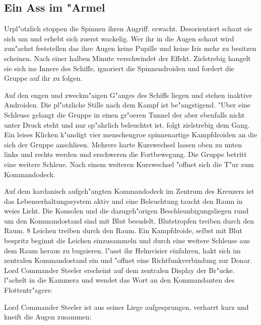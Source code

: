 \subsection{Ein Ass im "Armel}
Urpl"otzlich stoppen die Spinnen ihren Angriff. \xl{} erwacht. Desorientiert schaut sie sich um und erhebt sich zuerst wackelig. Wer ihr in die Augen schaut wird zun"achst feststellen das ihre Augen keine Pupille und keine Iris mehr zu besitzen scheinen. Nach einer halben Minute verschwindet der Effekt. Zielstrebig hangelt sie sich ins Innere des Schiffe, ignoriert die Spinnendroiden und fordert die Gruppe auf ihr zu folgen.


Auf den engen und zweckm"a\3igen G"anges des Schiffs liegen und stehen inaktive Androiden. Die pl"otzliche Stille nach dem Kampf ist be"angstigend. "Uber eine Schleuse gelangt die Gruppe in einen gr"o\3eren Tunnel der aber ebenfalls nicht unter Druck steht und nur sp"ahrlich beleuchtet ist. \xl{} folgt zielstrebig dem Gang. Ein leises Klicken k"undigt vier menschengro\3e spinnenartige Kampfdroiden an die sich der Gruppe anschlie\3en. Mehrere harte Kurswechsel lassen oben zu unten links und rechts werden und erschweren die Fortbewegung. 
Die Gruppe betritt eine weitere Schleu\3e. Nach einem weiteren Kurswechsel "offnet sich die T"ur zum Kommandodeck.

Auf dem kardanisch aufgeh"angten Kommandodeck im Zentrum des Kreuzers ist das Lebenserhaltungssystem aktiv und eine Beleuchtung taucht den Raum in wei\3es Licht. Die Konsolen und die dazugeh"origen Beschleunbigungsliegen rund um den Kommandostand sind mit Blut besudelt. Blutstropfen treiben durch den Raum. 8 Leichen treiben durch den Raum. Ein Kampfdroide, selbst mit Blut bespritz beginnt die Leichen einzusammeln und durch eine weitere Schleuse aus dem Raum heraus zu bugsieren. \xl{} l"asst ihr Helmvisier einfahren, hakt sich im zentralen Kommandostand ein und "offnet eine Richtfunkverbindung zur Donar. Lord Commander Steeler erscheint auf dem zentralen Display der Br"ucke. \xl{} l"achelt in die Kammera und wendet das Wort an den Kommandanten des Flottentr"agers:


Lord Commander Steeler ist aus seiner Liege aufgesprungen, verharrt kurz und kneift die Augen zusammen:

